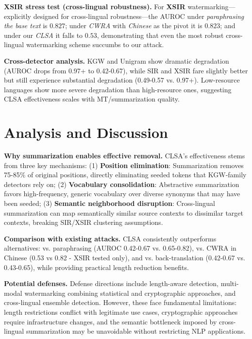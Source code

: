 \documentclass{article}
\begin{document}
\textbf{XSIR stress test (cross-lingual robustness).}
For \textbf{XSIR} watermarking—explicitly designed for cross-lingual robustness—the AUROC under \emph{paraphrasing the base text} is $0.827$; under \emph{CWRA} with \emph{Chinese} as the pivot it is $0.823$; and under our \emph{CLSA} it falls to $0.53$, demonstrating that even the most robust cross-lingual watermarking scheme succumbs to our attack.

\textbf{Cross-detector analysis.}
KGW and Unigram show dramatic degradation (AUROC drops from 0.97+ to 0.42-0.67), while SIR and XSIR fare slightly better but still experience substantial degradation (0.49-0.57 vs. 0.97+). Low-resource languages show more severe degradation than high-resource ones, suggesting CLSA effectiveness scales with MT/summarization quality.

\section{Analysis and Discussion}

\textbf{Why summarization enables effective removal.}
CLSA's effectiveness stems from three key mechanisms: (1) \textbf{Position elimination}: Summarization removes 75-85\% of original positions, directly eliminating seeded tokens that KGW-family detectors rely on; (2) \textbf{Vocabulary consolidation}: Abstractive summarization favors high-frequency, generic vocabulary over diverse synonyms that may have been seeded; (3) \textbf{Semantic neighborhood disruption}: Cross-lingual summarization can map semantically similar source contexts to dissimilar target contexts, breaking SIR/XSIR clustering assumptions.

\textbf{Comparison with existing attacks.}
CLSA consistently outperforms alternatives: vs. paraphrasing (AUROC 0.42-0.67 vs. 0.65-0.82), vs. CWRA in Chinese (0.53 vs 0.82 - XSIR tested only), and vs. back-translation (0.42-0.67 vs. 0.43-0.65), while providing practical length reduction benefits.

\textbf{Potential defenses.}
Defense directions include length-aware detection, multi-modal watermarking combining statistical and cryptographic approaches, and cross-lingual ensemble detection. However, these face fundamental limitations: length restrictions conflict with legitimate use cases, cryptographic approaches require infrastructure changes, and the semantic bottleneck imposed by cross-lingual summarization may be unavoidable without restricting NLP applications.
\end{document}
